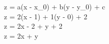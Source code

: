 z = a(x - x_0) + b(y - y_0) + c \implies \\
z = 2(x - 1) + 1(y - 0) + 2 \implies \\
z = 2x - 2 + y + 2 \implies \\
z = 2x + y